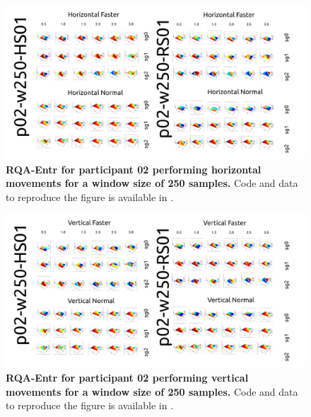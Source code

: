 \documentclass[12pt]{article}
\begin{document}


\newpage
\begin{figure}[ht!]
\centering
\includegraphics{sm-fig11}
    	\caption{
	{\bf RQA-Entr for participant 02 performing horizontal movements for a window size of 250 samples.}
	Code and data to reproduce the figure is available in \cite{srep2021}.
        }
    \label{fig-p02-H-w250}
\end{figure}
\begin{figure}[hb!]
\centering
\includegraphics{sm-fig12}
    	\caption{
	{\bf RQA-Entr for participant 02 performing vertical movements for a window size of 250 samples.}
	Code and data to reproduce the figure is available in \cite{srep2021}.
        }
    \label{fig-p02-V-w250}
\end{figure}
\end{document}
